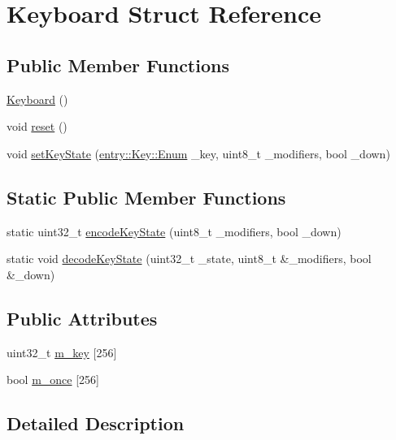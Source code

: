 \hypertarget{struct_keyboard}{\section{Keyboard Struct Reference}
\label{struct_keyboard}
}
\subsection*{Public Member Functions}
\begin{DoxyCompactItemize}
\item 
\hyperlink{struct_keyboard_ad6b0bb849d6bb7cdf63091e40b5f5f7f}{Keyboard} ()
\item 
void \hyperlink{struct_keyboard_a765a73cd072fcad73db2d1d9824e7595}{reset} ()
\item 
void \hyperlink{struct_keyboard_ad0bb11ec06e8f98f469b2e26c4fe0640}{set\+Key\+State} (\hyperlink{structentry_1_1_key_a2c04c2d92f79b961243e4244603ca633}{entry\+::\+Key\+::\+Enum} \+\_\+key, uint8\+\_\+t \+\_\+modifiers, bool \+\_\+down)
\end{DoxyCompactItemize}
\subsection*{Static Public Member Functions}
\begin{DoxyCompactItemize}
\item 
static uint32\+\_\+t \hyperlink{struct_keyboard_ad3fe9931dc47dbcba7d015b6e992e0aa}{encode\+Key\+State} (uint8\+\_\+t \+\_\+modifiers, bool \+\_\+down)
\item 
static void \hyperlink{struct_keyboard_a4ecf1b5b235b661456cd98539f006474}{decode\+Key\+State} (uint32\+\_\+t \+\_\+state, uint8\+\_\+t \&\+\_\+modifiers, bool \&\+\_\+down)
\end{DoxyCompactItemize}
\subsection*{Public Attributes}
\begin{DoxyCompactItemize}
\item 
uint32\+\_\+t \hyperlink{struct_keyboard_a944513802a9cf2a7454b688f1a16d0d9}{m\+\_\+key} \mbox{[}256\mbox{]}
\item 
bool \hyperlink{struct_keyboard_a860c38146c813be2c304b9b64703dc99}{m\+\_\+once} \mbox{[}256\mbox{]}
\end{DoxyCompactItemize}


\subsection{Detailed Description}


